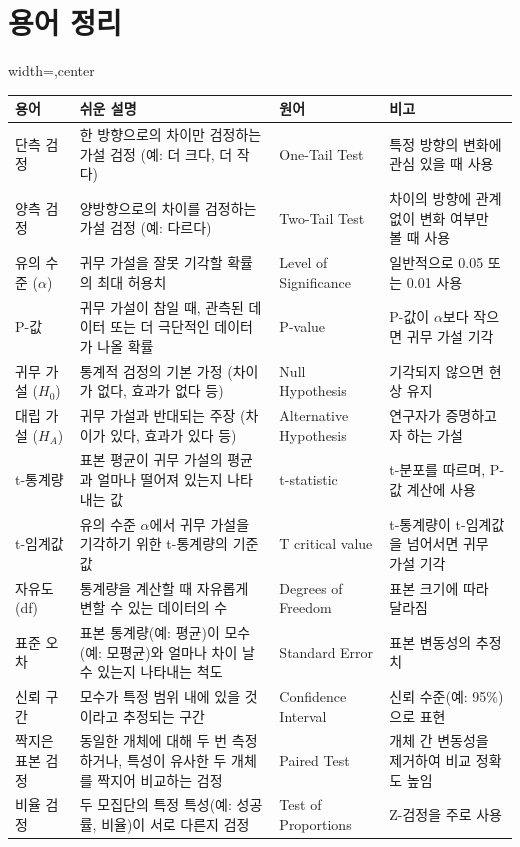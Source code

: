 \documentclass[11pt,a4paper]{article}
\begin{document}
\section*{용어 정리}
\begin{adjustbox}{width=\textwidth,center}
\begin{tabular}{llll}
\toprule
\textbf{용어} & \textbf{쉬운 설명} & \textbf{원어} & \textbf{비고} \\
\midrule
단측 검정 & 한 방향으로의 차이만 검정하는 가설 검정 (예: 더 크다, 더 작다) & One-Tail Test & 특정 방향의 변화에 관심 있을 때 사용 \\
양측 검정 & 양방향으로의 차이를 검정하는 가설 검정 (예: 다르다) & Two-Tail Test & 차이의 방향에 관계없이 변화 여부만 볼 때 사용 \\
유의 수준 ($\alpha$) & 귀무 가설을 잘못 기각할 확률의 최대 허용치 & Level of Significance & 일반적으로 0.05 또는 0.01 사용 \\
P-값 & 귀무 가설이 참일 때, 관측된 데이터 또는 더 극단적인 데이터가 나올 확률 & P-value & P-값이 $\alpha$보다 작으면 귀무 가설 기각 \\
귀무 가설 ($H_0$) & 통계적 검정의 기본 가정 (차이가 없다, 효과가 없다 등) & Null Hypothesis & 기각되지 않으면 현상 유지 \\
대립 가설 ($H_A$) & 귀무 가설과 반대되는 주장 (차이가 있다, 효과가 있다 등) & Alternative Hypothesis & 연구자가 증명하고자 하는 가설 \\
t-통계량 & 표본 평균이 귀무 가설의 평균과 얼마나 떨어져 있는지 나타내는 값 & t-statistic & t-분포를 따르며, P-값 계산에 사용 \\
t-임계값 & 유의 수준 $\alpha$에서 귀무 가설을 기각하기 위한 t-통계량의 기준 값 & T critical value & t-통계량이 t-임계값을 넘어서면 귀무 가설 기각 \\
자유도 (df) & 통계량을 계산할 때 자유롭게 변할 수 있는 데이터의 수 & Degrees of Freedom & 표본 크기에 따라 달라짐 \\
표준 오차 & 표본 통계량(예: 평균)이 모수(예: 모평균)와 얼마나 차이 날 수 있는지 나타내는 척도 & Standard Error & 표본 변동성의 추정치 \\
신뢰 구간 & 모수가 특정 범위 내에 있을 것이라고 추정되는 구간 & Confidence Interval & 신뢰 수준(예: 95\%)으로 표현 \\
짝지은 표본 검정 & 동일한 개체에 대해 두 번 측정하거나, 특성이 유사한 두 개체를 짝지어 비교하는 검정 & Paired Test & 개체 간 변동성을 제거하여 비교 정확도 높임 \\
비율 검정 & 두 모집단의 특정 특성(예: 성공률, 비율)이 서로 다른지 검정 & Test of Proportions & Z-검정을 주로 사용 \\
\bottomrule
\end{tabular}
\end{adjustbox}
\end{document}
